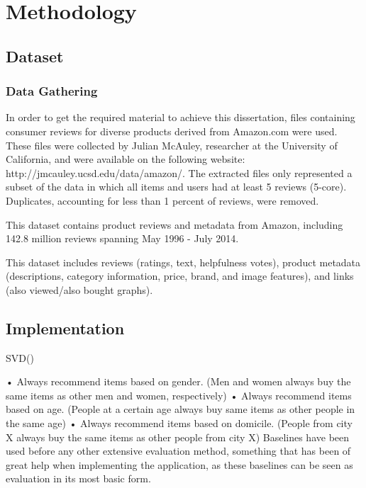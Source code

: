 \chapter{Methodology}

\section{Dataset}

\subsection{Data Gathering}
In order to get the required material to achieve this dissertation, files containing consumer reviews for diverse products derived from Amazon.com were used. These files were collected by Julian McAuley, researcher at the University of California, and were available on the following website: http://jmcauley.ucsd.edu/data/amazon/. The extracted files only represented a subset of the data in which all items and users had at least 5 reviews (5-core). Duplicates, accounting for less than 1 percent of reviews, were removed.

This dataset contains product reviews and metadata from Amazon, including 142.8 million reviews spanning May 1996 - July 2014.

This dataset includes reviews (ratings, text, helpfulness votes), product metadata (descriptions, category information, price, brand, and image features), and links (also viewed/also bought graphs). 

\section{Implementation}

SVD()


• Always recommend items based on gender. (Men and women always buy the same
items as other men and women, respectively)
• Always recommend items based on age. (People at a certain age always buy same
items as other people in the same age)
• Always recommend items based on domicile. (People from city X always buy the
same items as other people from city X)
Baselines have been used before any other extensive evaluation method, something that
has been of great help when implementing the application, as these baselines can be seen
as evaluation in its most basic form.

